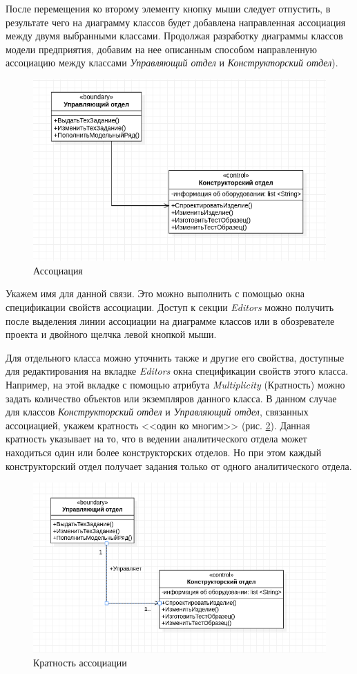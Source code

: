 \documentclass[a4paper,12pt]{extreport}
\begin{document}
После перемещения ко второму элементу кнопку мыши следует отпустить, в результате чего на диаграмму классов будет добавлена направленная ассоциация между двумя выбранными классами.
Продолжая разработку диаграммы классов модели предприятия, добавим на нее описанным способом направленную ассоциацию между классами \textit{Управляющий отдел} и \textit{Конструкторский отдел}).

\begin{figure}[h!]
	\centering
	\includegraphics[width=0.7\linewidth]{images/association}
	\caption{Ассоциация}
	\label{fig:association}
\end{figure}

Укажем имя для данной связи. Это можно выполнить с помощью окна спецификации свойств ассоциации. Доступ к секции \textit{Editors} можно получить после выделения линии ассоциации на диаграмме классов или в обозревателе проекта и двойного щелчка левой кнопкой мыши.

Для отдельного класса можно уточнить также и другие его свойства, доступные для редактирования на вкладке \textit{Editors} окна спецификации свойств этого класса. Например, на этой вкладке с помощью атрибута \textit{Multiplicity }(Кратность) можно задать количество объектов или экземпляров данного класса. В данном случае для классов \textit{Конструкторский отдел} и \textit{Управляющий отдел}, связанных ассоциацией, укажем кратность <<один ко многим>> (рис. \ref{fig:associationclasses}). Данная кратность указывает на то, что в ведении аналитического отдела может находиться один или более конструкторских отделов. Но при этом каждый конструкторский отдел получает задания только от одного аналитического отдела. 
\begin{figure}[h!]
	\centering
	\includegraphics[width=0.7\linewidth]{images/associationclasses}
	\caption{Кратность ассоциации}
	\label{fig:associationclasses}
\end{figure}
\end{document}
